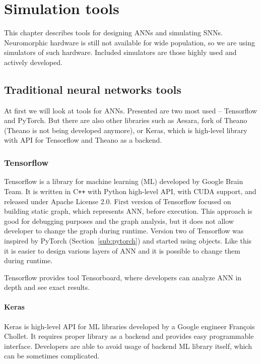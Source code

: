 \chapter{Simulation tools}
\label{ch:simulation_tools}

This chapter describes tools for designing ANNs and simulating SNNs. Neuromorphic hardware is still not available for wide population, so we are using simulators of such hardware. Included simulators are those highly used and actively developed.

%
%

\section{Traditional neural networks tools}%
\label{sec:traditional_neural_networks_tools}

At first we will look at tools for ANNs. Presented are two most used -- Tensorflow and PyTorch. But there are also other libraries such as Aesara, fork of Theano (Theano is not being developed anymore), or Keras, which is high-level library with API for Tensorflow and Theano as a backend.


\subsection{Tensorflow}%
\label{sub:tensorflow}

Tensorflow is a library for machine learning (ML) developed by Google Brain Team. It is written in C\verb!++! with Python high-level API, with CUDA support, and released under Apache License 2.0. First version of Tensorflow focused on building static graph, which represents ANN, before execution. This approach is good for debugging purposes and the graph analysis, but it does not allow developer to change the graph during runtime. Version two of Tensorflow was inspired by PyTorch (Section~\ref{sub:pytorch}) and started using objects. Like this it is easier to design various layers of ANN and it is possible to change them during runtime.

Tensorflow provides tool Tensorboard, where developers can analyze ANN in depth and see exact results. \cite{tensorflow}


\subsubsection{Keras}
\label{ssub:keras}

Keras is high-level API for ML libraries developed by a Google engineer François Chollet. It requires proper library as a backend and provides easy programmable interface. Developers are able to avoid usage of backend ML library itself, which can be sometimes complicated.

